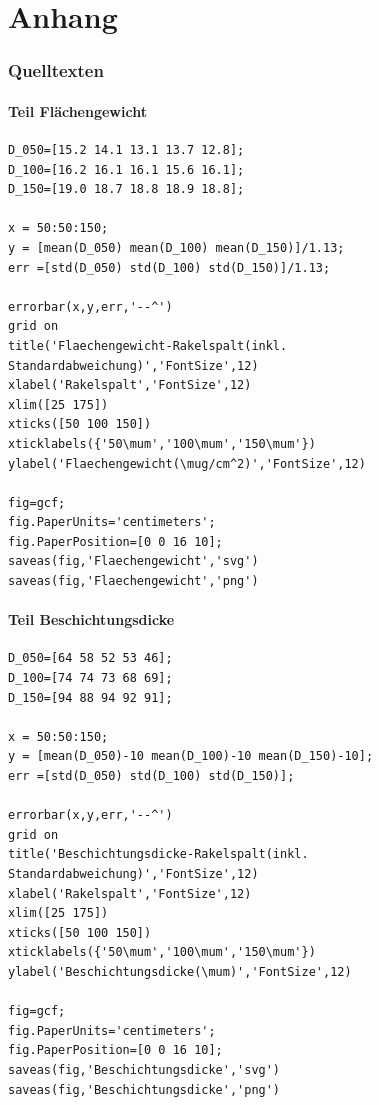 \documentclass[12pt,UTF8]{article}
\begin{document}
\part{Anhang}
\section{Quelltexten}
\subsection{Teil Fl\"achengewicht}
\begin{lstlisting}
D_050=[15.2 14.1 13.1 13.7 12.8];
D_100=[16.2 16.1 16.1 15.6 16.1];
D_150=[19.0 18.7 18.8 18.9 18.8];
    
x = 50:50:150;
y = [mean(D_050) mean(D_100) mean(D_150)]/1.13;
err =[std(D_050) std(D_100) std(D_150)]/1.13;
    
errorbar(x,y,err,'--^')
grid on
title('Flaechengewicht-Rakelspalt(inkl. Standardabweichung)','FontSize',12)
xlabel('Rakelspalt','FontSize',12)
xlim([25 175])
xticks([50 100 150])
xticklabels({'50\mum','100\mum','150\mum'})
ylabel('Flaechengewicht(\mug/cm^2)','FontSize',12)

fig=gcf;
fig.PaperUnits='centimeters';
fig.PaperPosition=[0 0 16 10];
saveas(fig,'Flaechengewicht','svg')
saveas(fig,'Flaechengewicht','png')
\end{lstlisting}

\subsection{Teil Beschichtungsdicke}
\begin{lstlisting}
D_050=[64 58 52 53 46];
D_100=[74 74 73 68 69];
D_150=[94 88 94 92 91];
    
x = 50:50:150;
y = [mean(D_050)-10 mean(D_100)-10 mean(D_150)-10];
err =[std(D_050) std(D_100) std(D_150)];
    
errorbar(x,y,err,'--^')
grid on
title('Beschichtungsdicke-Rakelspalt(inkl. Standardabweichung)','FontSize',12)
xlabel('Rakelspalt','FontSize',12)
xlim([25 175])
xticks([50 100 150])
xticklabels({'50\mum','100\mum','150\mum'})
ylabel('Beschichtungsdicke(\mum)','FontSize',12)

fig=gcf;
fig.PaperUnits='centimeters';
fig.PaperPosition=[0 0 16 10];
saveas(fig,'Beschichtungsdicke','svg')
saveas(fig,'Beschichtungsdicke','png')
\end{lstlisting}
\end{document}
